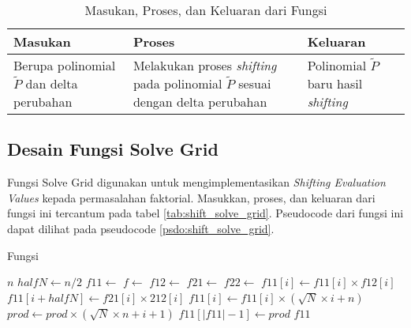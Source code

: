 \begin{table}[]	
	\Centering
	\begin{tabular}{|p{3cm}|p{3cm}|p{3cm}|}
	\hline
	Masukan & Proses & Keluaran \\ \hline
	Berupa polinomial $ \tilde{P} $ dan delta perubahan & Melakukan proses \textit{shifting} pada polinomial $ \tilde{P} $ sesuai dengan delta perubahan & Polinomial $ \tilde{P} $ baru hasil \textit{shifting} \\ \hline
	\end{tabular}
	\caption{Masukan, Proses, dan Keluaran dari Fungsi }
	\label{tab:shift_shift}
\end{table}

\newpage

\subsection{Desain Fungsi Solve Grid}
Fungsi Solve Grid digunakan untuk mengimplementasikan \textit{Shifting Evaluation Values} kepada permasalahan faktorial. Masukkan, proses, dan keluaran dari fungsi ini tercantum pada tabel \ref{tab:shift_solve_grid}. Pseudocode dari fungsi ini dapat dilihat pada pseudocode \ref{psdo:shift_solve_grid}.

\begin{algorithm}
	\caption{Fungsi }
	\label{psdo:shift_solve_grid}
	\begin{algorithmic}[1]
		\Require $ n $
			\Return [$1, 1 + \sqrt{N}$]
		\EndIf
		\State $ halfN \leftarrow n / 2 $
		\State $ f11 \leftarrow $ 
		\State $ f \leftarrow $ 
		\State $ f12 \leftarrow $ 
		\State $ f21 \leftarrow $ 
		\State $ f22 \leftarrow $ 
		 $f11[i] \leftarrow f11[i] \times f12[i] $
		\EndFor
		 $f11[i + halfN] \leftarrow f21[i] \times 212[i] $
		\EndFor
			 $f11[i] \leftarrow f11[i] \times (\sqrt{N} \times i + n) $
			\EndFor
			 $prod \leftarrow prod \times (\sqrt{N} \times n + i + 1) $
			\EndFor
			\State $ f11[|f11|-1] \leftarrow prod $
		\EndIf	
		\State \Return $f11$
	\end{algorithmic}
\end{algorithm}

